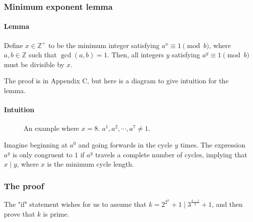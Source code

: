 \documentclass{article}
\newcommand{\Z}{\mathbb{Z}}
\begin{document}
\subsubsection{Minimum exponent lemma}
\paragraph{Lemma} Define $x \in \Z^+$ to be the minimum integer satisfying $a^x \equiv 1 \pmod b$, where $a, b \in \Z$ such that $\gcd(a, b) = 1$. Then, all integers $y$ satisfying $a^y \equiv 1 \pmod b$ must be divisible by $x$.

The proof is in Appendix C, but here is a diagram to give intuition for the lemma.
\paragraph{Intuition}
\begin{figure}[H]
    \centering
    \caption{An example where $x=8$. $a^1, a^2, \cdots, a^7 \neq 1$.}
\end{figure}

Imagine beginning at $a^0$ and going forwards in the cycle $y$ times. The expression $a^y$ is only congruent to $1$ if $a^y$ travels a complete number of cycles, implying that $x \mid y$, where $x$ is the minimum cycle length.

\subsubsection{The proof}
The "if" statement wishes for us to assume that $k = 2^{2^n}+1 \mid 3^{\frac{k-1}{2}}+1$, and then prove that $k$ is prime.
\end{document}
